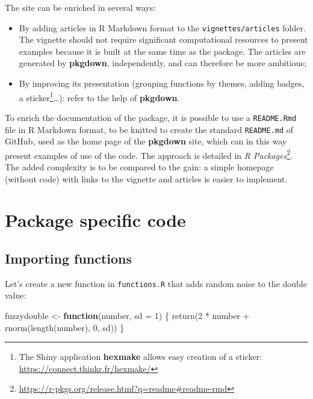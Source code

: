 \documentclass[
  12pt,
  american,
  a4paper,
  extrafontsizes,onecolumn,openright
  ]{memoir}
\newenvironment{Shaded}{\begin{snugshade}}{\end{snugshade}}
\newcommand{\AttributeTok}[1]{\textcolor[rgb]{0.77,0.63,0.00}{#1}}
\newcommand{\ControlFlowTok}[1]{\textcolor[rgb]{0.13,0.29,0.53}{\textbf{#1}}}
\newcommand{\DecValTok}[1]{\textcolor[rgb]{0.00,0.00,0.81}{#1}}
\newcommand{\FunctionTok}[1]{\textcolor[rgb]{0.00,0.00,0.00}{#1}}
\newcommand{\NormalTok}[1]{#1}
\newcommand{\OtherTok}[1]{\textcolor[rgb]{0.56,0.35,0.01}{#1}}
\newcommand{\SpecialCharTok}[1]{\textcolor[rgb]{0.00,0.00,0.00}{#1}}
\providecommand{\tightlist}{%
  \setlength{\itemsep}{0pt}\setlength{\parskip}{0pt}}
\begin{document}
The site can be enriched in several ways:

\begin{itemize}
\tightlist
\item
  By adding articles in R Markdown format to the \texttt{vignettes/articles} folder.
  The vignette should not require significant computational resources to present examples because it is built at the same time as the package.
  The articles are generated by \textbf{pkgdown}, independently, and can therefore be more ambitious;
\item
  By improving its presentation (grouping functions by themes, adding badges, a sticker\footnote{The Shiny application \textbf{hexmake} allows easy creation of a sticker: \url{https://connect.thinkr.fr/hexmake/}}\ldots): refer to the help of \textbf{pkgdown}.
\end{itemize}

To enrich the documentation of the package, it is possible to use a \texttt{README.Rmd} file in R Markdown format, to be knitted to create the standard \texttt{README.md} of GitHub, used as the home page of the \textbf{pkgdown} site, which can in this way present examples of use of the code.
The approach is detailed in \emph{R Packages}\footnote{\url{https://r-pkgs.org/release.html?q=readme\#readme-rmd}}.
The added complexity is to be compared to the gain: a simple homepage (without code) with links to the vignette and articles is easier to implement.

\hypertarget{package-specific-code}{%
\section{Package specific code}\label{package-specific-code}}

\hypertarget{importing-functions}{%
\subsection{Importing functions}\label{importing-functions}}

Let's create a new function in \texttt{functions.R} that adds random noise to the double value:

\scriptsize

\begin{Shaded}
\begin{Highlighting}[]
\NormalTok{fuzzydouble }\OtherTok{\textless{}{-}} \ControlFlowTok{function}\NormalTok{(number, }\AttributeTok{sd =} \DecValTok{1}\NormalTok{) \{}
    \FunctionTok{return}\NormalTok{(}\DecValTok{2} \SpecialCharTok{*}\NormalTok{ number }\SpecialCharTok{+} \FunctionTok{rnorm}\NormalTok{(}\FunctionTok{length}\NormalTok{(number), }\DecValTok{0}\NormalTok{, sd))}
\NormalTok{\}}
\end{Highlighting}
\end{Shaded}
\end{document}
